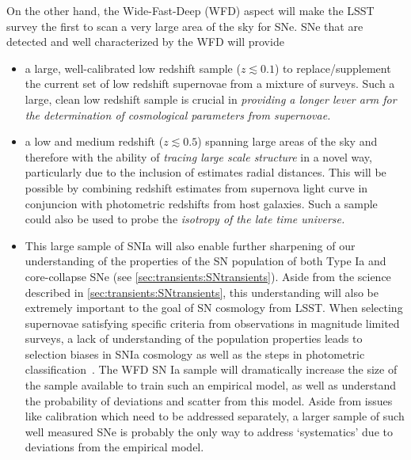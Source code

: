 On the other hand, the Wide-Fast-Deep (WFD) aspect will make the LSST survey
the first to scan a very large area of the sky for SNe. SNe that are detected
and well characterized by the WFD will provide 
\begin{itemize}
    \item a large, well-calibrated low redshift sample ($z \lesssim 0.1$) to replace/supplement the current  set of low redshift supernovae from a mixture of surveys. Such a large, clean low redshift sample is crucial in {\emph{providing a longer lever arm for the determination of cosmological parameters from supernovae.}}
    \item  a low and medium redshift ($z \lesssim 0.5$) spanning large areas of the sky and therefore with the ability of {\emph{tracing large scale structure}} in a novel way, particularly due to the inclusion of estimates radial distances. This will be possible by combining redshift estimates from supernova light curve in conjuncion with photometric redshifts from host galaxies.  Such a sample could also be used to probe the {\emph{isotropy of the late time universe.}}
    \item This large sample of SNIa will also enable further sharpening of our understanding of the properties of the SN 
population of both Type Ia and core-collapse SNe (see \autoref{sec:transients:SNtransients}). Aside from the science 
described in \autoref{sec:transients:SNtransients}, this understanding will also be extremely important to the goal of 
SN cosmology from LSST. When selecting supernovae satisfying specific criteria from observations in magnitude limited 
surveys, a lack of understanding of the population properties leads to selection biases in SNIa cosmology as well as the 
steps in photometric classification~\cite{Scolnic2016, Kessler2017}. 
The WFD SN Ia
sample will dramatically increase the size of the sample available to
train such an empirical model, as well as understand the probability of
deviations and scatter from this model. Aside from issues like
calibration which need to be addressed separately, a larger sample of
such well measured SNe is probably the only way to address `systematics'
due to deviations from the empirical model. 
\end{itemize}


